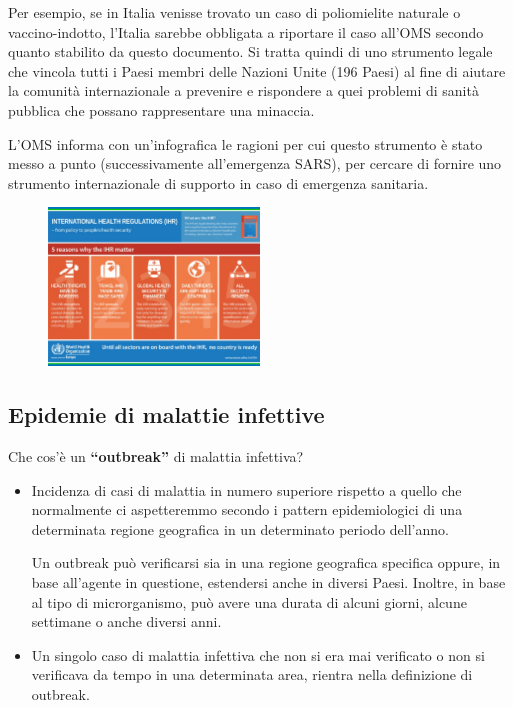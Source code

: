 Per esempio, se in Italia venisse trovato un caso di poliomielite
naturale o vaccino-indotto, l'Italia sarebbe obbligata a riportare il
caso all'OMS secondo quanto stabilito da questo documento. Si tratta
quindi di uno strumento legale che vincola tutti i Paesi membri delle
Nazioni Unite (196 Paesi) al fine di aiutare la comunità internazionale
a prevenire e rispondere a quei problemi di sanità pubblica che possano
rappresentare una minaccia.

L'OMS informa con un'infografica le ragioni per cui questo strumento è
stato messo a punto (successivamente all'emergenza SARS), per cercare di
fornire uno strumento internazionale di supporto in caso di emergenza
sanitaria.

\begin{figure}[!ht]
\centering
	\includegraphics[width=0.5\textwidth]{26/image6.jpeg}
	\end{figure}

\subsection{Epidemie di malattie infettive}

Che cos'è un \textbf{``outbreak''} di malattia infettiva?

\begin{itemize}
\item
  Incidenza di casi di malattia in numero superiore rispetto a quello
  che normalmente ci aspetteremmo secondo i pattern epidemiologici di
  una determinata regione geografica in un determinato periodo
  dell'anno.

Un outbreak può verificarsi sia in una regione geografica specifica
oppure, in base all'agente in questione, estendersi anche in diversi
Paesi. Inoltre, in base al tipo di microrganismo, può avere una durata
di alcuni giorni, alcune settimane o anche diversi anni.

\item
  Un singolo caso di malattia infettiva che non si era mai verificato o
  non si verificava da tempo in una determinata area, rientra nella
  definizione di outbreak.
  
\end{itemize}

